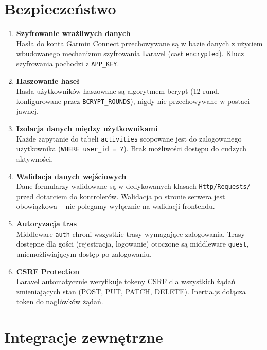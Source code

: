 \documentclass[12pt,a4paper]{report}
\begin{document}
\section{Bezpieczeństwo}

\begin{enumerate}[resume]

\item \textbf{Szyfrowanie wrażliwych danych} \\
Hasła do konta Garmin Connect przechowywane są w bazie danych z użyciem wbudowanego mechanizmu szyfrowania Laravel (cast \texttt{encrypted}). Klucz szyfrowania pochodzi z \texttt{APP\_KEY}.

\item \textbf{Haszowanie haseł} \\
Hasła użytkowników haszowane są algorytmem bcrypt (12 rund, konfigurowane przez \texttt{BCRYPT\_ROUNDS}), nigdy nie przechowywane w postaci jawnej.

\item \textbf{Izolacja danych między użytkownikami} \\
Każde zapytanie do tabeli \texttt{activities} scopowane jest do zalogowanego użytkownika (\texttt{WHERE user\_id = ?}). Brak możliwości dostępu do cudzych aktywności.

\item \textbf{Walidacja danych wejściowych} \\
Dane formularzy walidowane są w dedykowanych klasach \texttt{Http/Requests/} przed dotarciem do kontrolerów. Walidacja po stronie serwera jest obowiązkowa -- nie polegamy wyłącznie na walidacji frontendu.

\item \textbf{Autoryzacja tras} \\
Middleware \texttt{auth} chroni wszystkie trasy wymagające zalogowania. Trasy dostępne dla gości (rejestracja, logowanie) otoczone są middleware \texttt{guest}, uniemożliwiającym dostęp po zalogowaniu.

\item \textbf{CSRF Protection} \\
Laravel automatycznie weryfikuje tokeny CSRF dla wszystkich żądań zmieniających stan (POST, PUT, PATCH, DELETE). Inertia.js dołącza token do nagłówków żądań.

\end{enumerate}

\section{Integracje zewnętrzne}
\end{document}
